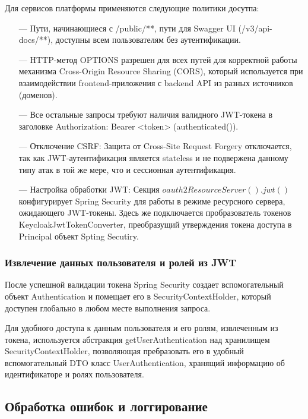 Для сервисов платформы применяются следующие политики досутпа:

\begin{itemize}
  \item[---]Пути, начинающиеся с /public/**, пути для Swagger UI (/v3/api-docs/**), доступны всем пользователям без аутентификации.
  \item[---]HTTP-метод OPTIONS разрешен для всех путей для корректной работы механизма Cross-Origin Resource Sharing (CORS)\cite{arai2024method}, который используется при взаимодействии frontend-приложения с backend API из разных источников (доменов).
  \item[---]Все остальные запросы требуют наличия валидного JWT-токена в заголовке Authorization: Bearer <token> (authenticated()).
  \item[---]Отключение CSRF\cite{barth2008robust}: Защита от Cross-Site Request Forgery отключается, так как JWT-аутентификация является stateless и не подвержена данному типу атак в той же мере, что и сессионная аутентификация.
  \item[---]Настройка обработки JWT: Секция $oauth2ResourceServer().jwt()$ конфигурирует Spring Security для работы в режиме ресурсного сервера, ожидающего JWT-токены. Здесь же подключается пробразователь токенов KeycloakJwtTokenConverter, преобразущий утверждения токена доступа в Principal объект Spting Secutiry.
\end{itemize}

\subsubsection{Извлечение данных пользователя и ролей из JWT}

После успешной валидации токена Spring Security создает вспомогательный объект Authentication и помещает его в SecurityContextHolder, который доступен глобально в любом месте выполнения запроса.

Для удобного доступа к данным пользователя и его ролям, извлеченным из токена, используется абстракция getUserAuthentication над хранилищем SecurityContextHolder, позволяющая пребразовать его в удобный вспомогательный DTO класс UserAuthentication, хранящий информацию об идентификаторе и ролях пользователя.

\subsection{Обработка ошибок и логгирование}

